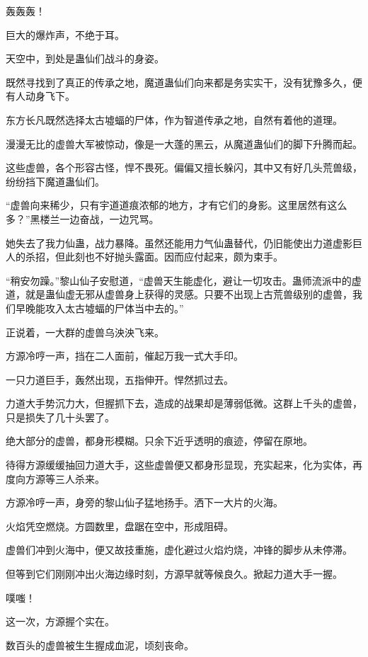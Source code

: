 
\begin{this_body}

轰轰轰！

巨大的爆炸声，不绝于耳。

天空中，到处是蛊仙们战斗的身姿。

既然寻找到了真正的传承之地，魔道蛊仙们向来都是务实实干，没有犹豫多久，便有人动身飞下。

东方长凡既然选择太古墟蝠的尸体，作为智道传承之地，自然有着他的道理。

漫漫无比的虚兽大军被惊动，像是一大蓬的黑云，从魔道蛊仙们的脚下升腾而起。

这些虚兽，各个形容古怪，悍不畏死。偏偏又擅长躲闪，其中又有好几头荒兽级，纷纷挡下魔道蛊仙们。

“虚兽向来稀少，只有宇道道痕浓郁的地方，才有它们的身影。这里居然有这么多？”黑楼兰一边奋战，一边咒骂。

她失去了我力仙蛊，战力暴降。虽然还能用力气仙蛊替代，仍旧能使出力道虚影巨人的杀招，但此刻也不好抛头露面。因而应付起来，颇为束手。

“稍安勿躁。”黎山仙子安慰道，“虚兽天生能虚化，避让一切攻击。蛊师流派中的虚道，就是蛊仙虚无邪从虚兽身上获得的灵感。只要不出现上古荒兽级别的虚兽，我们早晚能攻入太古墟蝠的尸体当中去的。”

正说着，一大群的虚兽乌泱泱飞来。

方源冷哼一声，挡在二人面前，催起万我一式大手印。

一只力道巨手，轰然出现，五指伸开。悍然抓过去。

力道大手势沉力大，但握抓下去，造成的战果却是薄弱低微。这群上千头的虚兽，只是损失了几十头罢了。

绝大部分的虚兽，都身形模糊。只余下近乎透明的痕迹，停留在原地。

待得方源缓缓抽回力道大手，这些虚兽便又都身形显现，充实起来，化为实体，再度向方源等三人杀来。

方源冷哼一声，身旁的黎山仙子猛地扬手。洒下一大片的火海。

火焰凭空燃烧。方圆数里，盘踞在空中，形成阻碍。

虚兽们冲到火海中，便又故技重施，虚化避过火焰灼烧，冲锋的脚步从未停滞。

但等到它们刚刚冲出火海边缘时刻，方源早就等候良久。掀起力道大手一握。

噗嗤！

这一次，方源握个实在。

数百头的虚兽被生生握成血泥，顷刻丧命。


\end{this_body}
